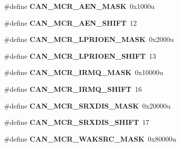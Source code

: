 \begin{DoxyCompactItemize}
\item 
\#define {\bfseries C\+A\+N\+\_\+\+M\+C\+R\+\_\+\+A\+E\+N\+\_\+\+M\+A\+SK}~0x1000u\hypertarget{group__CAN__Register__Masks_gaf788111bd2bf9a69160d0a0cb713c926}{}\label{group__CAN__Register__Masks_gaf788111bd2bf9a69160d0a0cb713c926}

\item 
\#define {\bfseries C\+A\+N\+\_\+\+M\+C\+R\+\_\+\+A\+E\+N\+\_\+\+S\+H\+I\+FT}~12\hypertarget{group__CAN__Register__Masks_ga6c610bd65cb9471ad0ca511dbe2c86d4}{}\label{group__CAN__Register__Masks_ga6c610bd65cb9471ad0ca511dbe2c86d4}

\item 
\#define {\bfseries C\+A\+N\+\_\+\+M\+C\+R\+\_\+\+L\+P\+R\+I\+O\+E\+N\+\_\+\+M\+A\+SK}~0x2000u\hypertarget{group__CAN__Register__Masks_ga1420cc0cb40d414296a741397ee07116}{}\label{group__CAN__Register__Masks_ga1420cc0cb40d414296a741397ee07116}

\item 
\#define {\bfseries C\+A\+N\+\_\+\+M\+C\+R\+\_\+\+L\+P\+R\+I\+O\+E\+N\+\_\+\+S\+H\+I\+FT}~13\hypertarget{group__CAN__Register__Masks_gaaf89fabb5183062196edf8dc4a3f6770}{}\label{group__CAN__Register__Masks_gaaf89fabb5183062196edf8dc4a3f6770}

\item 
\#define {\bfseries C\+A\+N\+\_\+\+M\+C\+R\+\_\+\+I\+R\+M\+Q\+\_\+\+M\+A\+SK}~0x10000u\hypertarget{group__CAN__Register__Masks_gad68843c21c6243f255601d8973f4e7eb}{}\label{group__CAN__Register__Masks_gad68843c21c6243f255601d8973f4e7eb}

\item 
\#define {\bfseries C\+A\+N\+\_\+\+M\+C\+R\+\_\+\+I\+R\+M\+Q\+\_\+\+S\+H\+I\+FT}~16\hypertarget{group__CAN__Register__Masks_gae30b928fb3ce512c48cb0be04af69acd}{}\label{group__CAN__Register__Masks_gae30b928fb3ce512c48cb0be04af69acd}

\item 
\#define {\bfseries C\+A\+N\+\_\+\+M\+C\+R\+\_\+\+S\+R\+X\+D\+I\+S\+\_\+\+M\+A\+SK}~0x20000u\hypertarget{group__CAN__Register__Masks_ga29b3d428d19a7204c53f56c7467172f1}{}\label{group__CAN__Register__Masks_ga29b3d428d19a7204c53f56c7467172f1}

\item 
\#define {\bfseries C\+A\+N\+\_\+\+M\+C\+R\+\_\+\+S\+R\+X\+D\+I\+S\+\_\+\+S\+H\+I\+FT}~17\hypertarget{group__CAN__Register__Masks_gae2513ad87a72bc6f2bb88be59a3e0836}{}\label{group__CAN__Register__Masks_gae2513ad87a72bc6f2bb88be59a3e0836}

\item 
\#define {\bfseries C\+A\+N\+\_\+\+M\+C\+R\+\_\+\+W\+A\+K\+S\+R\+C\+\_\+\+M\+A\+SK}~0x80000u\hypertarget{group__CAN__Register__Masks_ga17c7cd88f6b2d344709e803f78d1b2f4}{}\label{group__CAN__Register__Masks_ga17c7cd88f6b2d344709e803f78d1b2f4}


\end{DoxyCompactItemize}
